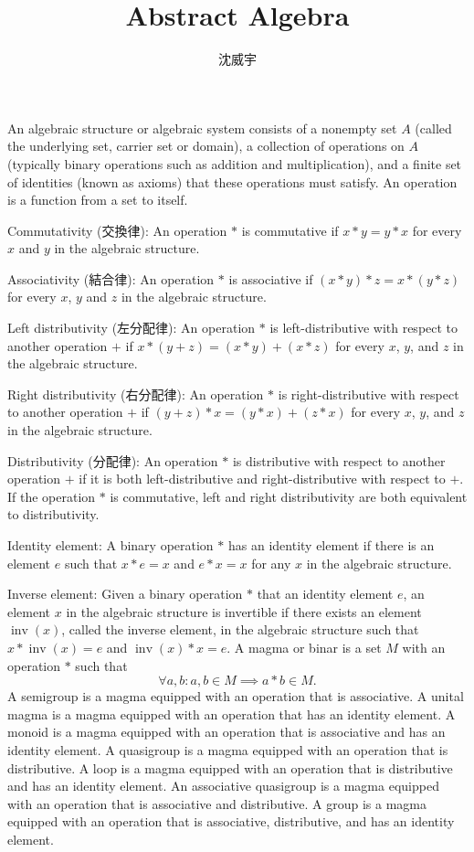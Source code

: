 \documentclass[a4paper,12pt]{article}
\begin{document}
\title{Abstract Algebra}
\author{沈威宇}
\date{\temtoday}
\titletocdoc
{}
An algebraic structure or algebraic system consists of a nonempty set $A$ (called the underlying set, carrier set or domain), a collection of operations on $A$ (typically binary operations such as addition and multiplication), and a finite set of identities (known as axioms) that these operations must satisfy.
An operation is a function from a set to itself.
\bit
\item Commutativity (交換律): An operation $*$ is commutative if $x*y=y*x$ for every $x$ and $y$ in the algebraic structure.
\item Associativity (結合律): An operation $*$ is associative if $(x*y)*z=x*(y*z)$ for every $x$, $y$ and $z$ in the algebraic structure.
\item Left distributivity (左分配律): An operation $*$ is left-distributive with respect to another operation $+$ if $x*(y+z)=(x*y)+(x*z)$ for every $x$, $y$, and $z$ in the algebraic structure.
\item Right distributivity (右分配律): An operation $*$ is right-distributive with respect to another operation $+$ if $(y+z)*x=(y*x)+(z*x)$ for every $x$, $y$, and $z$ in the algebraic structure.
\item Distributivity (分配律): An operation $*$ is distributive with respect to another operation $+$ if it is both left-distributive and right-distributive with respect to $+$. If the operation $*$ is commutative, left and right distributivity are both equivalent to distributivity.
\eit
{}
\bit
\item Identity element: A binary operation $*$ has an identity element if there is an element $e$ such that $x*e=x$ and $e*x=x$ for any $x$ in the algebraic structure.
\item Inverse element: Given a binary operation $*$ that an identity element $e$, an element $x$ in the algebraic structure is invertible if there exists an element $\operatorname{inv}(x)$, called the inverse element, in the algebraic structure such that $x*\operatorname{inv}(x)=e$ and $\operatorname{inv}(x)*x=e$.
\eit
{}
A magma or binar is a set $M$ with an operation $*$ such that
\[\forall a,b\colon a,b\in M\implies a*b\in M.\]
A semigroup is a magma equipped with an operation that is associative.
A unital magma is a magma equipped with an operation that has an identity element.
A monoid is a magma equipped with an operation that is associative and has an identity element.
A quasigroup is a magma equipped with an operation that is distributive.
A loop is a magma equipped with an operation that is distributive and has an identity element.
An associative quasigroup is a magma equipped with an operation that is associative and distributive.
A group is a magma equipped with an operation that is associative, distributive, and has an identity element.
\end{document}
